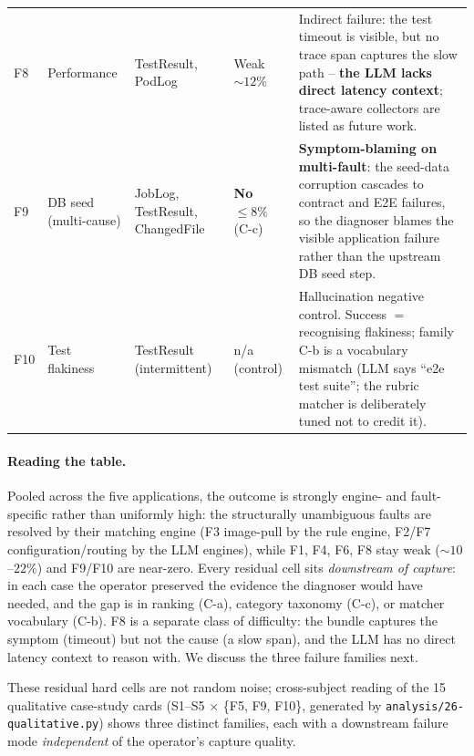 \documentclass[sigconf, nonacm=true, anonymous=false, review=false]{acmart}
\newcommand{\fn}[1]{F#1\xspace}
\begin{document}
\begin{table}[t]
\begin{tabularx}{\textwidth}{P{0.04\textwidth} P{0.15\textwidth} P{0.20\textwidth} P{0.11\textwidth} Y}
\fn{8}  & Performance           & TestResult, PodLog                   & Weak ${\sim}12\%$   & Indirect failure: the test timeout is visible, but no trace span captures the slow path -- \textbf{the LLM lacks direct latency context}; trace-aware collectors are listed as future work. \\
\fn{9}  & DB seed (multi-cause) & JobLog, TestResult, ChangedFile      & \textbf{No} ${\le}8\%$ (C-c) & \textbf{Symptom-blaming on multi-fault}: the seed-data corruption cascades to contract and E2E failures, so the diagnoser blames the visible application failure rather than the upstream DB seed step. \\
\fn{10} & Test flakiness        & TestResult (intermittent)            & n/a (control)       & Hallucination negative control. Success $=$ recognising flakiness; family C-b is a vocabulary mismatch (LLM says ``e2e test suite''; the rubric matcher is deliberately tuned not to credit it). \\
\bottomrule
\end{tabularx}
\end{table}

\paragraph{Reading the table.} Pooled across the five applications, the
outcome is strongly engine- and fault-specific rather than uniformly
high: the structurally unambiguous faults are resolved by their matching
engine (\fn{3} image-pull by the rule engine, \fn{2}/\fn{7}
configuration/routing by the LLM engines), while \fn{1}, \fn{4}, \fn{6},
\fn{8} stay weak (${\sim}10$--$22\%$) and \fn{9}/\fn{10} are near-zero.
Every residual cell sits \emph{downstream of capture}: in each case the
operator preserved the evidence the diagnoser would have needed, and the
gap is in ranking (C-a), category taxonomy (C-c), or matcher vocabulary
(C-b). \fn{8} is a separate class of difficulty: the bundle captures the
symptom (timeout) but not the cause (a slow span), and the LLM has no
direct latency context to reason with. We discuss the three failure
families next.

These residual hard cells are not random noise; cross-subject reading of
the 15 qualitative case-study cards (S1--S5 $\times$ \{\fn{5}, \fn{9},
\fn{10}\}, generated by \texttt{analysis/26-qualitative.py}) shows three
distinct families, each with a downstream failure mode \emph{independent}
of the operator's capture quality.
\end{document}
